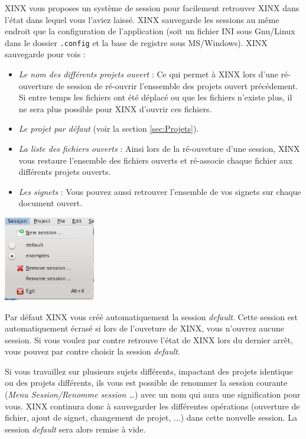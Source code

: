 \documentclass[a4paper,10pt,twoside]{book}
\begin{document}
XINX vous proposes un système de session pour facilement retrouver XINX dans l'état dans lequel vous l'aviez laissé. XINX sauvegarde les sessions au même endroit que la configuration de l'application (soit un fichier INI sous Gnu/Linux dans le dossier \verb+.config+ et la base de registre sous MS/Windows). XINX sauvegarde pour vois :
\begin{itemize}
 \item \emph{Le nom des différents projets ouvert} : Ce qui permet à XINX lors d'une ré-ouverture de session de ré-ouvrir l'enssemble des projets ouvert précédement. Si entre temps les fichiers ont été déplacé ou que les fichiers n'existe plus, il ne sera plus possible pour XINX d'ouvrir ces fichiers.
 \item \emph{Le projet par défaut} (voir la section \ref{sec:Projets}).
 \item \emph{La liste des fichiers ouverts} : Ainsi lors de la ré-ouveture d'une session, XINX vous restaure l'ensemble des fichiers ouverts et ré-associe chaque fichier aux différents projets ouverts.
 \item \emph{Les signets} : Vous pouvez aussi retrouver l'ensemble de vos signets sur chaque document ouvert.
\end{itemize}

\begin{center}
 \includegraphics[width=0.30\textwidth]{./xinxsessionmenu.png}
\end{center}

Par défaut XINX vous créé automatiquement la session \emph{default}. Cette session est automatiquement écrasé si lors de l'ouveture de XINX, vous n'ouvrez aucune session.  Si vous voulez par contre retrouve l'état de XINX lors du dernier arrêt, vous pouvez par contre choisir la session \emph{default}.

Si vous travaillez sur plusieurs sujets différents, impactant des projets identique ou des projets différents, ils vous est possible de renommer la session courante (\emph{Menu Session/Renomme session \dots}) avec un nom qui aura une signification pour vous. XINX continura donc à sauvegarder les différentes opérations (ouverture de fichier, ajout de signet, changement de projet, ...) dans cette nouvelle session. La session \emph{default} sera alors remise à vide.
\end{document}

